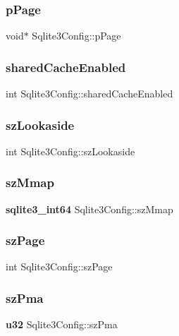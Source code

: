 \subsubsection{pPage}
{\footnotesize\ttfamily void$\ast$ Sqlite3\+Config\+::p\+Page}

\mbox{\label{struct_sqlite3_config_ad9837f5e2f338d708234afdb8878184f}} 
\subsubsection{sharedCacheEnabled}
{\footnotesize\ttfamily int Sqlite3\+Config\+::shared\+Cache\+Enabled}

\mbox{\label{struct_sqlite3_config_ad7504c4c1867db9837b40d7c22ba7582}} 
\subsubsection{szLookaside}
{\footnotesize\ttfamily int Sqlite3\+Config\+::sz\+Lookaside}

\mbox{\label{struct_sqlite3_config_ab5fb29ac41756c38a16bf3555adca853}} 
\subsubsection{szMmap}
{\footnotesize\ttfamily \textbf{ sqlite3\+\_\+int64} Sqlite3\+Config\+::sz\+Mmap}

\mbox{\label{struct_sqlite3_config_aab2aff0daff6b09c1d77299c81892a28}} 
\subsubsection{szPage}
{\footnotesize\ttfamily int Sqlite3\+Config\+::sz\+Page}

\mbox{\label{struct_sqlite3_config_a189f09eced1df52e9d0d9ce95dde5f46}} 
\subsubsection{szPma}
{\footnotesize\ttfamily \textbf{ u32} Sqlite3\+Config\+::sz\+Pma}

